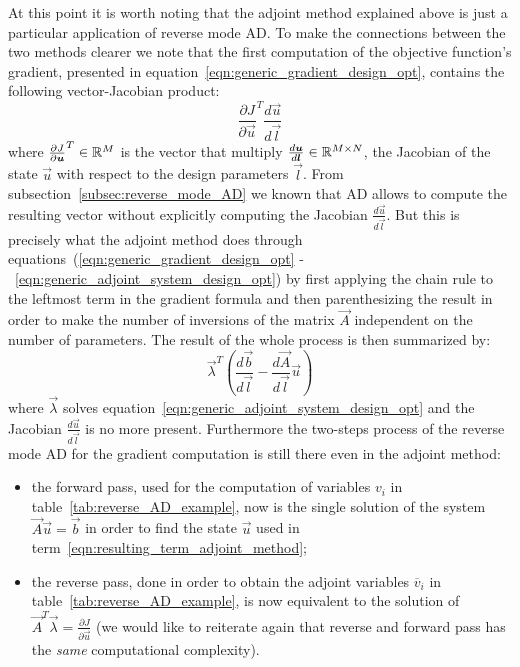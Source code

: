 \bigskip
At this point it is worth noting that the adjoint method explained above is just a particular application of reverse mode AD. To make the connections between the two methods clearer we note that the first computation of the  objective function's gradient, presented in equation~\eqref{eqn:generic_gradient_design_opt}, contains the following vector-Jacobian product:
\begin{equation}
	\label{eqn:vJp_design_opt}
	\frac{\partial J}{\partial \vec{u}}^T \frac{d\vec{u}}{d\vec{l}}
\end{equation}
where $\frac{\partial J}{\partial \boldsymbol{u}}^T \in \mathbb{R}^M$ is the vector that multiply $\frac{d\boldsymbol{u}}{d\boldsymbol{l}} \in \mathbb{R}^{M \times N}$, the Jacobian of the state $\vec{u}$ with respect to the design parameters $\vec{l}$.
From subsection~\ref{subsec:reverse_mode_AD} we known that AD allows to compute the resulting vector without explicitly computing the Jacobian $\frac{d\vec{u}}{d\vec{l}}$. But this is precisely what the adjoint method does through equations~(\ref{eqn:generic_gradient_design_opt} -~\ref{eqn:generic_adjoint_system_design_opt}) by first applying the chain rule to the leftmost term in the gradient formula and then parenthesizing the result in order to make the number of inversions of the matrix $\vec{A}$ independent on the number of parameters.
The result of the whole process is then summarized by:
\begin{equation}
	\label{eqn:resulting_term_adjoint_method}
	\vec{\lambda}^T \left( \frac{d\vec{b}}{d\vec{l}} - \frac{d\vec{A}}{d\vec{l}}\vec{u} \right)
\end{equation}
where $\vec{\lambda}$ solves equation~\eqref{eqn:generic_adjoint_system_design_opt} and the Jacobian $\frac{d\vec{u}}{d\vec{l}}$ is no more present. Furthermore the two-steps process of the reverse mode AD for the gradient computation is still there even in the adjoint method:
\begin{itemize}
	\item the forward pass, used for the computation of variables $v_i$ in table~\vref{tab:reverse_AD_example}, now is the single solution of the system $\vec{A}\vec{u}=\vec{b}$ in order to find the state $\vec{u}$ used in term~\eqref{eqn:resulting_term_adjoint_method};
	\item the reverse pass, done in order to obtain the adjoint variables $\overline{v}_i$ in table~\ref{tab:reverse_AD_example}, is now equivalent to the solution of $\vec{A}^T \vec{\lambda} = \frac{\partial J}{\partial \vec{u}}$ (we would like to reiterate again that reverse and forward pass has the \emph{same} computational complexity). 
\end{itemize}

